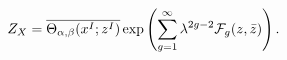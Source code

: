 \begin{equation}
 Z_X = \overline{\Theta_{\alpha, \beta} (x^I;z^I)} \exp \left( 
 \sum_{g=1}^{\infty} \lambda^{2g - 2} {\cal
 F}_g(z, \bar{z})\right).
 \label{eq:fullresult}
\end{equation}

